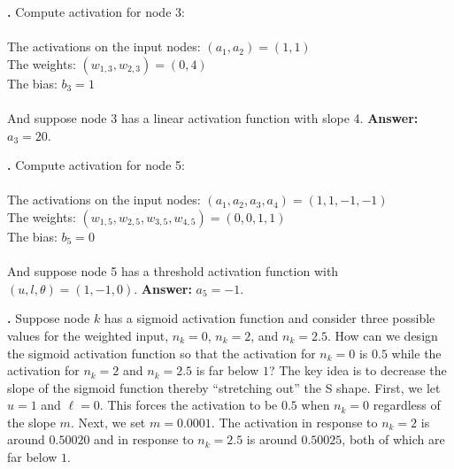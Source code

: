 \bigskip

\noindent
{\bf \theActFunctionCounter.} Compute activation for node 3: \\ \\
\indent \qquad\qquad The activations on the input nodes: $(a_1,a_2) = (1,1)$\\
\indent \qquad\qquad The weights: $(w_{1,3}, w_{2,3}) = (0,4)$ \\
\indent \qquad\qquad The bias: $b_3 = 1$ \\ \\
And suppose node 3 has a  linear activation function with slope 4.
{\bf Answer:}  $a_3=20$.

\bigskip

\noindent
{\bf \theActFunctionCounter.} Compute activation for node 5: \\ \\
\indent \qquad\qquad The activations on the input nodes: $(a_1,a_2, a_3, a_4) = (1,1,-1,-1)$\\
\indent \qquad\qquad The weights: $(w_{1,5}, w_{2,5}, w_{3,5}, w_{4,5}) = (0,0,1,1)$ \\
\indent \qquad\qquad The bias: $b_5 = 0$ \\ \\
And suppose node 5 has a threshold activation function with $(u,l,\theta) = (1,-1,0)$.
{\bf Answer:}  $a_5=-1$.

\bigskip

\noindent
{\bf \theActFunctionCounter.} Suppose node $k$ has a sigmoid activation function and 
consider three possible values for the weighted input, \ie $n_k=0$, $n_k = 2$, and 
$n_k=2.5$. How can we design the sigmoid activation function so that the 
activation for $n_k=0$ is $0.5$ while the activation for $n_k = 2$ and 
$n_k=2.5$ is far below $1$?  The key idea is to decrease the slope of the 
sigmoid function thereby ``stretching out'' the S shape. First, we let $u=1$ 
and $\ell=0$. This forces the activation to be $0.5$ when $n_k=0$ regardless 
of the slope $m$. Next, we set $m=0.0001$. The activation in response to 
$n_k=2$ is around $0.50020$ and in response to $n_k=2.5$ is around $0.50025$, 
both of which are far below $1$.

\bigskip
